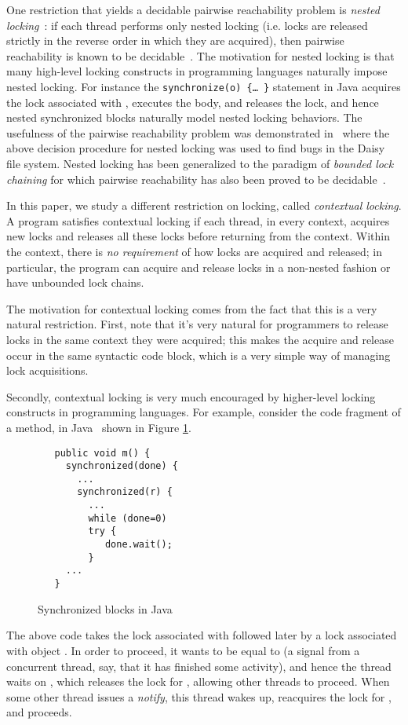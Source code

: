 \documentclass{LMCS}
\begin{document}
One restriction that yields a decidable pairwise reachability problem
is \emph{nested locking}~\cite{kig05,kg06}: if each thread performs
only nested locking (i.e. locks are released strictly in the reverse order
in which they are acquired), then pairwise reachability is known to be
decidable~\cite{kig05}.  The motivation for nested locking is that many
high-level locking constructs in programming languages naturally
impose nested locking. For instance the {\tt synchronize(o) \{\ldots
  \}} statement in Java acquires the lock associated with , executes the
body, and releases the lock, and hence nested synchronized blocks
naturally model nested locking behaviors. The usefulness of the pairwise 
reachability problem was demonstrated in~\cite{kig05} where the above  decision procedure for
nested locking was used to find bugs in the Daisy file system.
 Nested locking has been
generalized to the paradigm of \emph{bounded lock chaining} for which
pairwise reachability has also been proved to be
decidable~\cite{kah09,kah11}. 


In this paper, we study a different restriction on locking, called
\emph{contextual locking}. A program satisfies contextual locking if
each thread, in every context, acquires new locks and releases all
these locks before returning from the context. Within the context,
there is \emph{no requirement} of how locks are acquired and released;
in particular, the program can acquire and release locks in a
non-nested fashion or have unbounded lock chains.

The motivation for contextual locking comes from the fact that this is
a very natural restriction. First, note that it's very natural for
programmers to release locks in the same context they were acquired;
this makes the acquire and release occur in the same syntactic code block,
which is a very simple way of managing lock acquisitions.

Secondly, contextual locking is very much encouraged by higher-level
locking constructs in programming languages.  For example, consider
the code fragment of a method, in Java~\cite{lea} shown in Figure
\ref{fig:javaexxample}.
\begin{figure}
\begin{verbatim}
   public void m() {
     synchronized(done) {
       ...
       synchronized(r) {
         ...
         while (done=0)
         try {
            done.wait();
         }
     ...
   }
\end{verbatim}
\caption{Synchronized blocks in Java}
\label{fig:javaexxample}
\end{figure}
The above code takes the lock associated with  followed
later by a lock associated with object .  In order to proceed, it
wants  to be equal to  (a signal from a concurrent thread,
say, that it has finished some activity), and hence the thread waits
on , which releases the lock for ,
allowing other threads to proceed. When some other thread issues a
\emph{notify}, this thread wakes up, reacquires the lock for ,
and proceeds.
\end{document}
